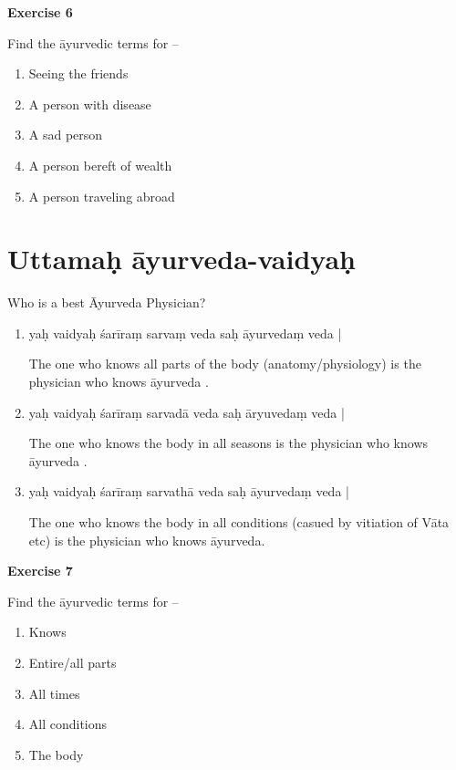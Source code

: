 \begin{center}
\textbf{\large Exercise 6}
\end{center}

Find the āyurvedic terms for –
\begin{enumerate}
\renewcommand{\theenumi}{\alph{enumi}}
\renewcommand{\labelenumi}{\theenumi.}
\item Seeing the friends
\item A person with disease
\item A sad person
\item A person bereft of wealth
\item A person traveling abroad 
\end{enumerate}

\chapter{Uttamaḥ  āyurveda-vaidyaḥ}
\begin{center}
Who is a best Āyurveda Physician?
\end{center}

\begin{enumerate}
\item {}

yaḥ vaidyaḥ śarīraṃ sarvaṃ  veda saḥ āyurvedaṃ veda | 

The one who knows all parts of the body (anatomy/physiology) is the physician who knows āyurveda . 

\item {}

yaḥ vaidyaḥ śarīraṃ  sarvadā veda saḥ āryuvedaṃ veda | 

The one who knows the body in all seasons is the physician who knows āyurveda .

\item {}

yaḥ vaidyaḥ śarīraṃ  sarvathā veda saḥ āyurvedaṃ veda | 

The one who knows the body in all conditions (casued by vitiation of Vāta etc) is the physician who knows āyurveda.
\end{enumerate}

\begin{center}
\textbf{\large Exercise 7}
\end{center}

Find the āyurvedic terms for –
\begin{enumerate}
\renewcommand{\theenumi}{\alph{enumi}}
\renewcommand{\labelenumi}{\theenumi.}
\item Knows
\item Entire/all parts
\item All times
\item All conditions
\item The body
\end{enumerate}

